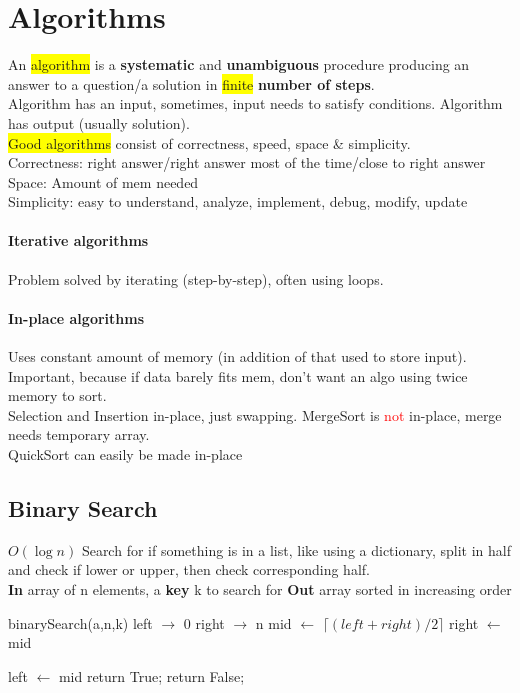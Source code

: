 \color{Blue}
\section{Algorithms}
An \colorbox{Yellow}{algorithm} is a \textbf{systematic} and \textbf{unambiguous} procedure producing an answer to a question/a solution in \colorbox{Yellow}{finite} \textbf{number of steps}.
\\ Algorithm has an input, sometimes, input needs to satisfy conditions. Algorithm has output (usually solution).
\\ \colorbox{Yellow}{Good algorithms} consist of correctness, speed, space \& simplicity. 
\\ Correctness: right answer/right answer most of the time/close to right answer
\\ Space: Amount of mem needed
\\ Simplicity: easy to understand, analyze, implement, debug, modify, update
\paragraph{Iterative algorithms} Problem solved by iterating (step-by-step), often using loops.
\paragraph{In-place algorithms} Uses constant amount of memory (in addition of that used to store input). Important, because if data barely fits mem, don't want an algo using twice memory to sort.
\\ Selection and Insertion in-place, just swapping. MergeSort is \textcolor{Red}{not} in-place, merge needs temporary array.
\\ QuickSort can easily be made in-place
\subsection{Binary Search}$O(\log{n})$ Search for if something is in a list, like using a dictionary, split in half and check if lower or upper, then check corresponding half.\\ %
\textbf{In} array of n elements, a \textbf{key} k to search for \textbf{Out} array sorted in increasing order
\begin{algorithmic}
\State binarySearch(a,n,k)
\State left $\to$ 0
\State right $\to$ n
	\State mid $\gets$ $\lceil (left+right)/2 \rceil $
	 right $\gets$ mid 
	
	\Else left $\gets$ mid
	\EndIf
\EndWhile
{} return True;
\Else return False;
\EndIf
\end{algorithmic}
